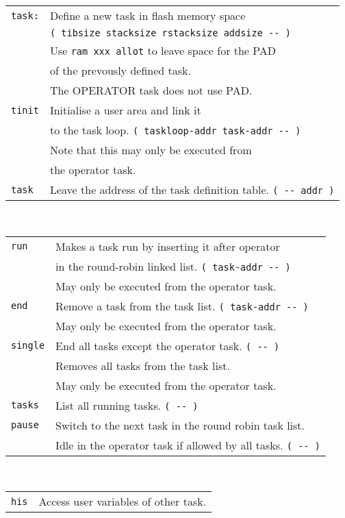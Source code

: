 \documentclass[10pt,landscape,a4paper]{article}
\begin{document}
\begin{multicols}{3}
\begin{tabular}{@{}ll@{}}
\verb!task:! & Define a new task in flash memory space \\
             & \verb!( tibsize stacksize rstacksize addsize -- )! \\
             & Use \verb!ram xxx allot! to leave space for the PAD \\
             & of the prevously defined task. \\
             & The OPERATOR task does not use PAD.\\
\verb!tinit! & Initialise a user area and link it \\
             & to the task loop. \verb!( taskloop-addr task-addr -- )! \\
             & Note that this may only be executed from \\
             & the operator task. \\
\verb!task!  & Leave the address of the task definition table. \verb!( -- addr )! \\
\end{tabular} \\
\begin{tabular}{@{}ll@{}}
\verb!run!  & Makes a task run by inserting it after operator \\
            & in the round-robin linked list. \verb!( task-addr -- )! \\
            & May only be executed from the operator task. \\
\verb!end!  & Remove a task from the task list. \verb!( task-addr -- )! \\
            & May only be executed from the operator task. \\
\verb!single!  & End all tasks except the operator task. \verb!( -- )! \\
               & Removes all tasks from the task list. \\
               & May only be executed from the operator task. \\
\verb!tasks!  & List all running tasks. \verb!( -- )! \\
\verb!pause!  & Switch to the next task in the round robin task list. \\
              & Idle in the operator task if allowed by all tasks. \verb!( -- )! \\
\end{tabular} \\
\begin{tabular}{@{}ll@{}}
\verb!his!  & Access user variables of other task. \\

\end{tabular}
\end{multicols}
\end{document}
